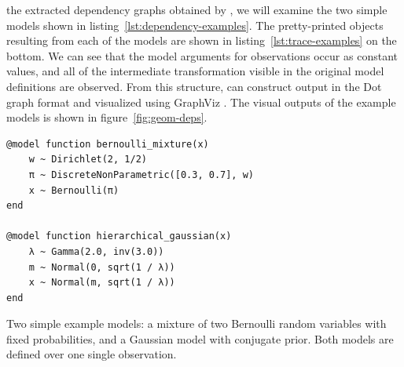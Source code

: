  the extracted dependency graphs obtained by \autogibbsjl{}, we will
examine the two simple models shown in listing~\ref{lst:dependency-examples}.  The pretty-printed
 objects resulting from each of the models are shown in
listing~\ref{lst:trace-examples} on the bottom.  We can see that the model arguments for
observations occur as constant values, and all of the intermediate transformation visible in the
original model definitions are observed.  From this structure, \autogibbsjl{} can construct output
in the Dot graph format and visualized using GraphViz \parencite{gansner2000open}.  The visual
outputs of the example models is shown in figure~\ref{fig:geom-deps}.

\begin{lstfloat}[p]
\begin{lstlisting}[style=lstfloat]
@model function bernoulli_mixture(x)
    w ~ Dirichlet(2, 1/2)
    π ~ DiscreteNonParametric([0.3, 0.7], w)
    x ~ Bernoulli(π)
end

@model function hierarchical_gaussian(x)
    λ ~ Gamma(2.0, inv(3.0))
    m ~ Normal(0, sqrt(1 / λ))
    x ~ Normal(m, sqrt(1 / λ))
end
\end{lstlisting}
  \caption{Two simple example models: a mixture of two Bernoulli random variables with fixed
    probabilities, and a Gaussian model with conjugate prior.  Both models are defined over one
    single observation.}
  \label{lst:dependency-examples}
\end{lstfloat}

